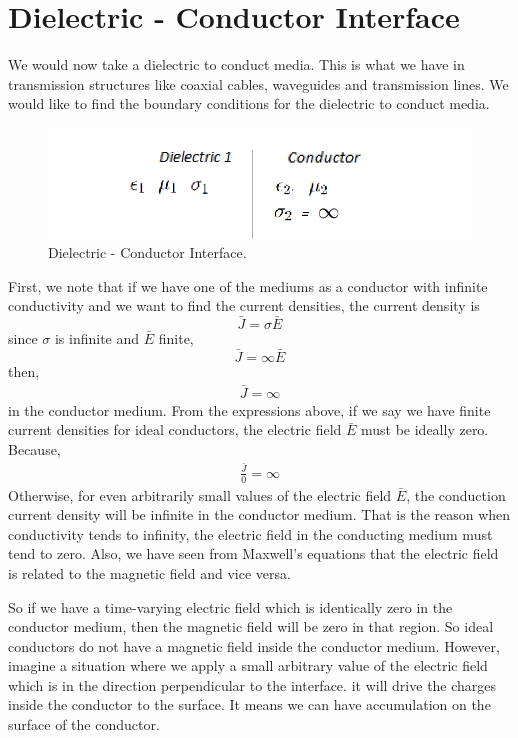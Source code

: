 \section{Dielectric - Conductor Interface}
We would now take a dielectric to conduct media. This is what we have in transmission structures like coaxial cables, waveguides and transmission lines. We would like to find the boundary conditions for the dielectric to conduct media. 
\begin{figure}[h]
\centering
\includegraphics[width=1\linewidth]{graphics/diemedium5_2}
\caption{Dielectric - Conductor Interface.}
\end{figure}

First, we note that if we have one of the mediums as a  conductor with infinite conductivity and we want to find the current densities, the current density is 
\begin{equation}
\bar{J} = \sigma\bar{E}
\end{equation}
since $\sigma$ is infinite and $\bar{E}$ finite,
\begin{equation*}
\bar{J} = \infty\bar{E}
\end{equation*} 
then,
\begin{align*}
\bar{J} = \infty
\end{align*}
in the conductor medium. From the expressions above, if we say we have finite current densities for ideal conductors, the electric field $\bar{E}$ must be ideally zero. Because,
\begin{align*}
\frac{\bar{J}}{0} = \infty
\end{align*}
Otherwise, for even arbitrarily small values of the electric field $\bar{E}$, the conduction current density will be infinite in the conductor medium. That is the reason when conductivity tends to infinity, the electric field in the conducting medium must tend to zero. Also, we have seen from Maxwell's equations that the electric field is related to the magnetic field and vice versa. 

So if we have a time-varying electric field which is identically zero in the conductor medium, then the magnetic field will be zero in that region. So ideal conductors do not have a magnetic field inside the conductor medium. However, imagine a situation where we apply a small arbitrary value of the electric field which is in the direction perpendicular to the interface. it will drive the charges inside the conductor to the surface. It means we can have accumulation on the surface of the conductor. 

